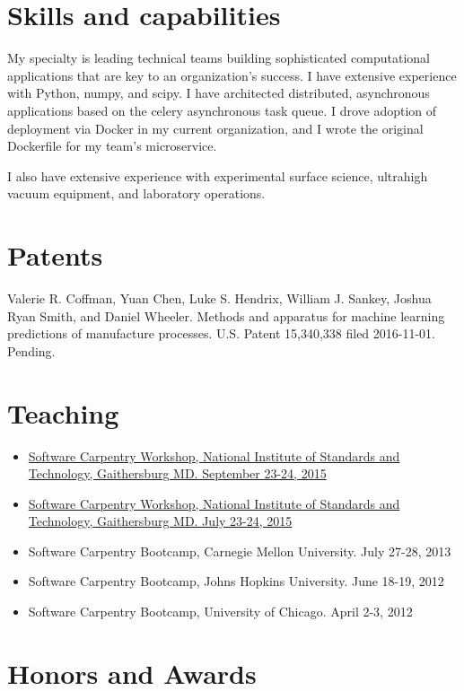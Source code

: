 \section{Skills and capabilities}

My specialty is leading technical teams building sophisticated
computational applications that are key to an organization's success. I
have extensive experience with Python, numpy, and scipy. I have
architected distributed, asynchronous applications based on the celery
asynchronous task queue. I drove adoption of deployment via Docker in my
current organization, and I wrote the original Dockerfile for my team's
microservice.

I also have extensive experience with experimental surface science,
ultrahigh vacuum equipment, and laboratory operations.

\section{Patents}\label{patents}

Valerie R. Coffman, Yuan Chen, Luke S. Hendrix, William J. Sankey,
Joshua Ryan Smith, and Daniel Wheeler. Methods and apparatus for machine
learning predictions of manufacture processes. U.S. Patent 15,340,338
filed 2016-11-01. Pending.

\section{Teaching}\label{teaching}

\begin{itemize}
\item
  \href{https://pages.nist.gov/2015-09-23-nist/}{Software Carpentry
  Workshop, National Institute of Standards and Technology, Gaithersburg
  MD. September 23-24, 2015}
\item
  \href{https://pages.nist.gov/2015-07-23-nist/}{Software Carpentry
  Workshop, National Institute of Standards and Technology, Gaithersburg
  MD. July 23-24, 2015}
\item
  Software Carpentry Bootcamp, Carnegie Mellon University. July 27-28,
  2013
\item
  Software Carpentry Bootcamp, Johns Hopkins University. June 18-19,
  2012
\item
  Software Carpentry Bootcamp, University of Chicago. April 2-3, 2012
\end{itemize}

\section{Honors and Awards}

